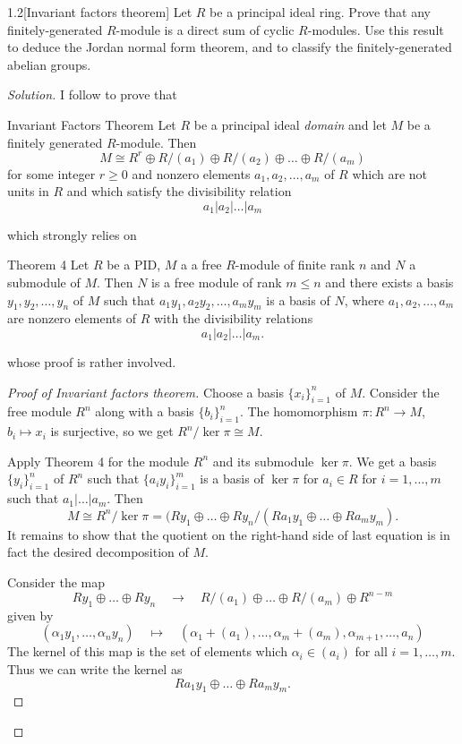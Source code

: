\begin{manualexercise}{1.2}[Invariant factors theorem]
	Let $R$ be a principal ideal ring. Prove that any finitely-generated $R$-module is a direct sum of cyclic $R$-modules. Use this result to deduce the Jordan normal form theorem, and to classify the finitely-generated abelian groups.	
\end{manualexercise}

\begin{proof}[Solution]\leavevmode
	I follow \cite{dummit} to prove that
	 \begin{idea4}{Invariant Factors Theorem}\leavevmode
		Let $R$ be a principal ideal \textit{domain} and let $M$ be a finitely generated $R$-module. Then 
		\[M\cong  R^r\oplus R/(a_1)\oplus R/(a_2)\oplus \ldots\oplus R/(a_m)\]
		for some integer $r\geq 0$ and nonzero elements $a_1,a_2,\ldots,a_m$ of $R$ which are not units in $R$ and which satisfy the divisibility relation
		\[a_1|a_2|\ldots|a_m\]
		 \end{idea4}
	which strongly relies on
		\begin{idea3}{Theorem 4}\leavevmode
		Let $R$ be a PID, $M$ a a free $R$-module of finite rank $n$ and $N$ a submodule of $M$. Then $N$ is a free module of rank $m\leq n$ and there exists a basis $y_1,y_2,\ldots,y_n$ of $M$ such that $a_1y_1,a_2y_2,\ldots,a_my_m$ is a basis of $N$, where $a_1,a_2,\ldots,a_m$ are nonzero elements of $R$ with the divisibility relations
		\[a_1|a_2|\ldots|a_m.\]
	\end{idea3}
whose proof is rather involved.

\begin{proof}[Proof of Invariant factors theorem]
		Choose a basis $\{x_i\}_{i=1}^n$ of $M$. Consider the free module $R^n$ along with a basis $\{b_i\}_{i=1}^n$. The homomorphism $\pi:R^n\to M$, $b_i\mapsto x_i$ is surjective, so we get $R^n/\ker \pi\cong M$.

		Apply Theorem 4 for the module $R^n$ and its submodule $\ker \pi$. We get a basis $\{y_i\}_{i=1}^n$ of $R^n$ such that $\{a_iy_i\}_{i=1}^m$ is a basis of $\ker \pi$ for $a_i\in R$ for $i=1,\ldots,m$ such that $a_1|\ldots|a_m$. Then
\[M\cong R^n/\ker \pi=(Ry_1\oplus \ldots\oplus Ry_n\Big/(Ra_1y_1\oplus \ldots\oplus Ra_my_m).\]
It remains to show that the quotient on the right-hand side of last equation is in fact the desired decomposition of $M$.

Consider the map
\[Ry_1\oplus \ldots\oplus Ry_n \quad \longrightarrow \quad R/(a_1)\oplus \ldots\oplus R/(a_m)\oplus R^{n-m}\]
given by
\[(\alpha_1y_1,\ldots,\alpha_ny_n)\quad \longmapsto\quad (\alpha_1+(a_1),\ldots,\alpha_m+(a_m),\alpha_{m+1},\ldots,a_n)\]
The kernel of this map is the set of elements which $\alpha_i\in(a_i)$ for all $i=1,\ldots,m$. Thus we can write the kernel as 
\[Ra_1y_1\oplus \ldots\oplus Ra_my_m.\]
	\end{proof}


\end{proof}
